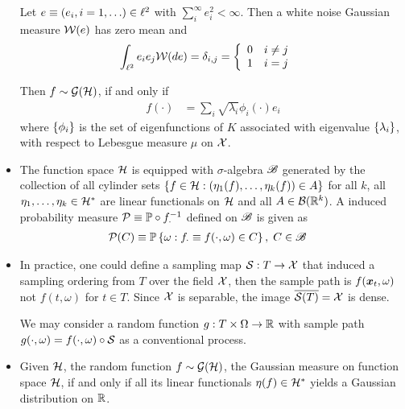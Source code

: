\documentclass[11pt]{article}
\begin{document}
\begin{itemize}
Let $e\equiv\left(e_{i}, i=1,\ldots\right)\in \ell^{2}$ with $\sum_{i}^{\infty}e^{2}_{i}<\infty$. Then a white noise Gaussian measure ${\mathcal W}(e)$ has zero mean and 
\begin{align*}
\int_{\ell^{2}}e_{i}e_{j}{\mathcal W}(de) &= \delta_{i,j} =\left\{ \begin{array}{cc}
0 & i\neq j \\ 
1 & i = j
\end{array} \right.
\end{align*} 

Then $f\sim {\mathcal G}({\mathcal H})$, if and only if 
\begin{align*}
f(\cdot) &= \sum_{i}\sqrt{\lambda_{i}}\phi_{i}(\cdot)e_{i}
\end{align*}
where $\left\{\phi_{i}\right\}$ is the set of eigenfunctions of $K$ associated with eigenvalue $\left\{\lambda_{i}\right\}$, with respect to Lebesgue measure $\mu$ on ${\mathcal X}$.\\[10pt]






\item  The function space ${\mathcal H} $ is equipped with $\sigma$-algebra ${\mathscr B}$ generated by the collection of all cylinder sets $\left\{f\in {\mathcal H}: (\eta_{1}(f), \ldots, \eta_{k}(f))\in A \right\}$ for all $k$, all $\eta_{1},\ldots, \eta_{k} \in {\mathcal H}^{*}$ are linear functionals on ${\mathcal H}$ and all $A\in {\mathcal B}({\mathbb R}^{k})$. A induced probability measure ${\mathcal P} \equiv {\mathbb P} \circ f_{\cdot}^{-1}$ defined on ${\mathscr B}$ is given as 
\begin{align*}
{\mathcal P}(C) &\equiv {\mathbb P}\left\{\omega: f_{\cdot}\equiv  f(\cdot, \omega) \in C  \right\}, \; C\in {\mathscr B}
\end{align*}



\item In practice, one could define a sampling map ${\mathcal S}: T\rightarrow {\mathcal X}$ that induced a sampling ordering from $T$ over the field ${\mathcal X}$, then the sample path is $f(\boldsymbol{x}_{t}, \omega)$ not $f(t, \omega)$ for $t\in T$. Since ${\mathcal X}$ is separable, the image $\overline{{\mathcal S}(T)}= {\mathcal X}$ is dense. 
 
  We may consider a random function $g: T \times \Omega \rightarrow {\mathbb R}$ with sample path $g(\cdot, \omega)= f(\cdot, \omega)\circ {\mathcal S}$ as a conventional process.

\item  Given ${\mathcal H}$, the random function $f\sim {\mathcal G}({\mathcal H})$, the Gaussian measure on function space ${\mathcal H}$, if and only if all its linear functionals $\eta(f)\in {\mathcal H}^{*}$ yields a Gaussian distribution on ${\mathbb R}$. 

\end{itemize}
\end{document}

